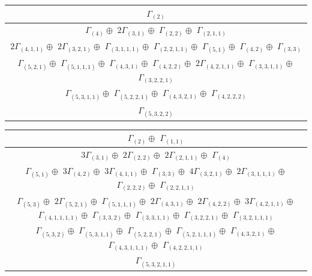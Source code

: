 \documentclass[main.tex]{subfiles}
\begin{document}
\bigskip
\begin{minipage}{1\textwidth}
\centering
\begin{tabular}{c}
$\Gamma_{(
2
)}$
\\ \hline
$\Gamma_{(
4
)} \oplus$
$ 2 \Gamma_{(
3 , 
1
)} \oplus$
$\Gamma_{(
2 , 
2
)} \oplus$
$\Gamma_{(
2 , 
1 , 
1
)}$
\\ \hline
$ 2 \Gamma_{(
4 , 
1 , 
1
)} \oplus$
$ 2 \Gamma_{(
3 , 
2 , 
1
)} \oplus$
$\Gamma_{(
3 , 
1 , 
1 , 
1
)} \oplus$
$\Gamma_{(
2 , 
2 , 
1 , 
1
)} \oplus$
$\Gamma_{(
5 , 
1
)} \oplus$
$\Gamma_{(
4 , 
2
)} \oplus$
$\Gamma_{(
3 , 
3
)}$
\\ \hline
$\Gamma_{(
5 , 
2 , 
1
)} \oplus$
$\Gamma_{(
5 , 
1 , 
1 , 
1
)} \oplus$
$\Gamma_{(
4 , 
3 , 
1
)} \oplus$
$\Gamma_{(
4 , 
2 , 
2
)} \oplus$
$ 2 \Gamma_{(
4 , 
2 , 
1 , 
1
)} \oplus$
$\Gamma_{(
3 , 
3 , 
1 , 
1
)} \oplus$
$\Gamma_{(
3 , 
2 , 
2 , 
1
)}$
\\ \hline
$\Gamma_{(
5 , 
3 , 
1 , 
1
)} \oplus$
$\Gamma_{(
5 , 
2 , 
2 , 
1
)} \oplus$
$\Gamma_{(
4 , 
3 , 
2 , 
1
)} \oplus$
$\Gamma_{(
4 , 
2 , 
2 , 
2
)}$
\\ \hline
$\Gamma_{(
5 , 
3 , 
2 , 
2
)}$
\\
\end{tabular}\end{minipage}
\bigskip
\begin{minipage}{1\textwidth}
\centering
\begin{tabular}{c}
$\Gamma_{(
2
)} \oplus$
$\Gamma_{(
1 , 
1
)}$
\\ \hline
$ 3 \Gamma_{(
3 , 
1
)} \oplus$
$ 2 \Gamma_{(
2 , 
2
)} \oplus$
$ 2 \Gamma_{(
2 , 
1 , 
1
)} \oplus$
$\Gamma_{(
4
)}$
\\ \hline
$\Gamma_{(
5 , 
1
)} \oplus$
$ 3 \Gamma_{(
4 , 
2
)} \oplus$
$ 3 \Gamma_{(
4 , 
1 , 
1
)} \oplus$
$\Gamma_{(
3 , 
3
)} \oplus$
$ 4 \Gamma_{(
3 , 
2 , 
1
)} \oplus$
$ 2 \Gamma_{(
3 , 
1 , 
1 , 
1
)} \oplus$
$\Gamma_{(
2 , 
2 , 
2
)} \oplus$
$\Gamma_{(
2 , 
2 , 
1 , 
1
)}$
\\ \hline
$\Gamma_{(
5 , 
3
)} \oplus$
$ 2 \Gamma_{(
5 , 
2 , 
1
)} \oplus$
$\Gamma_{(
5 , 
1 , 
1 , 
1
)} \oplus$
$ 2 \Gamma_{(
4 , 
3 , 
1
)} \oplus$
$ 2 \Gamma_{(
4 , 
2 , 
2
)} \oplus$
$ 3 \Gamma_{(
4 , 
2 , 
1 , 
1
)} \oplus$
$\Gamma_{(
4 , 
1 , 
1 , 
1 , 
1
)} \oplus$
$\Gamma_{(
3 , 
3 , 
2
)} \oplus$
$\Gamma_{(
3 , 
3 , 
1 , 
1
)} \oplus$
$\Gamma_{(
3 , 
2 , 
2 , 
1
)} \oplus$
$\Gamma_{(
3 , 
2 , 
1 , 
1 , 
1
)}$
\\ \hline
$\Gamma_{(
5 , 
3 , 
2
)} \oplus$
$\Gamma_{(
5 , 
3 , 
1 , 
1
)} \oplus$
$\Gamma_{(
5 , 
2 , 
2 , 
1
)} \oplus$
$\Gamma_{(
5 , 
2 , 
1 , 
1 , 
1
)} \oplus$
$\Gamma_{(
4 , 
3 , 
2 , 
1
)} \oplus$
$\Gamma_{(
4 , 
3 , 
1 , 
1 , 
1
)} \oplus$
$\Gamma_{(
4 , 
2 , 
2 , 
1 , 
1
)}$
\\ \hline
$\Gamma_{(
5 , 
3 , 
2 , 
1 , 
1
)}$
\\
\end{tabular}\end{minipage}
\end{document}
